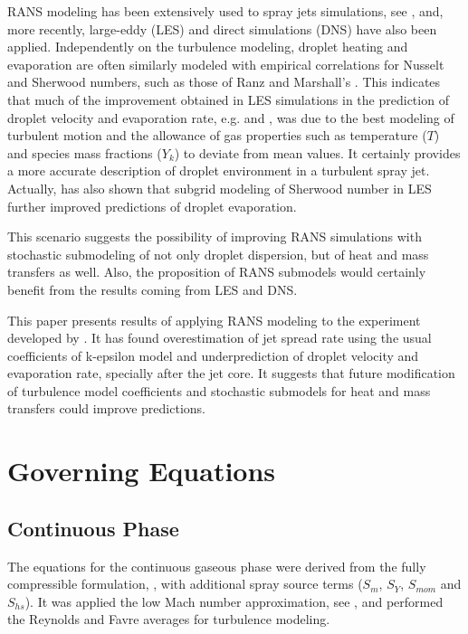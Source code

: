 \documentclass[preprint,12pt,review]{elsarticle}
\begin{document}
RANS modeling has been extensively used to spray jets simulations, see \citet{baumgarten2006mixture}, and, more recently, large-eddy (LES) and direct simulations (DNS) have also been applied. Independently on the turbulence modeling, droplet heating and evaporation are often similarly modeled with empirical correlations for Nusselt and Sherwood numbers, such as those of Ranz and Marshall's \citet{ranzmarshall}. This indicates that much of the improvement obtained in LES simulations in the prediction of droplet velocity and evaporation rate, e.g. \citet{bini} and \citet{moin},  was due to the best modeling of turbulent motion and the allowance of gas properties such as temperature ($T$) and species mass fractions ($Y_k$) to deviate from mean values. It certainly provides a more accurate description of droplet environment in a turbulent spray jet. Actually, \citet{bini} has also shown that subgrid modeling of Sherwood number in LES further improved predictions of droplet evaporation.

This scenario suggests the possibility of improving RANS simulations with stochastic submodeling of not only droplet dispersion, but of heat and mass transfers as well. Also, the proposition of RANS submodels would certainly benefit from the results coming from LES and DNS.

This paper presents results of applying RANS modeling to the experiment developed by \citet{chen}. It has found overestimation of jet spread rate using the usual coefficients of k-epsilon model and underprediction of droplet velocity and evaporation rate, specially after the jet core. It suggests that future modification of turbulence model coefficients and stochastic submodels for heat and mass transfers could improve predictions.

\section{Governing Equations}
\label{equations}


\subsection{Continuous Phase}\label{continuous_phase}
The equations for the continuous gaseous phase were derived from the fully compressible formulation, \citet{poinsot2005theoretical}, with additional spray source terms ($S_m$, $S_Y$, $S_{mom}$ and $S_{hs}$). It was applied the low Mach number approximation, see \citet{majda}, and performed the Reynolds and Favre averages for turbulence modeling.
\end{document}
